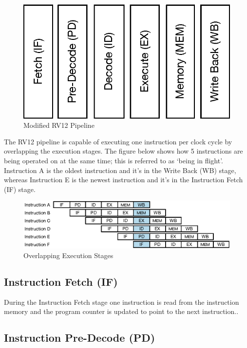 \begin{figure}[hbt]
  \includegraphics{assets/img/Pipeline-RV12}
  \caption{Modified RV12 Pipeline}
\end{figure}

The RV12 pipeline is capable of executing one instruction per clock cycle by
overlapping the execution stages.  The figure below shows how 5 instructions are
being operated on at the same time; this is referred to as `being in flight'.
Instruction A is the oldest instruction and it's in the Write Back (WB) stage,
whereas Instruction E is the newest instruction and it's in the Instruction
Fetch (IF) stage.

\begin{figure}[hbt]
  \includegraphics{assets/img/Pipeline-Overlap}
  \caption{Overlapping Execution Stages}
\end{figure}

\subsection{Instruction Fetch (IF)} \label{instruction-fetch-if}

During the Instruction Fetch stage one instruction is read from the instruction
memory and the program counter is updated to point to the next instruction..

\subsection{Instruction Pre-Decode (PD)} \label{instruction-pre-decode-pd}

